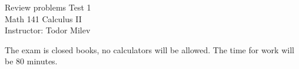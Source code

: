\documentclass{article}
\begin{document}
\begin{center}
\Large
Review problems Test 1\\ Math 141 Calculus II \\ \normalsize Instructor: Todor Milev
\end{center}


\noindent The exam is closed books, no calculators will be allowed. The time for work will be 80 minutes. %
\end{document}
